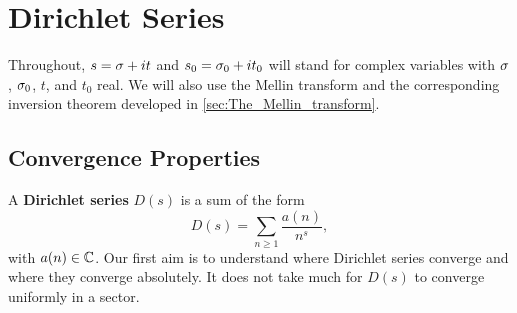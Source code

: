 \chapter{Dirichlet Series}
  Throughout, \(s = \sigma+it\) and \(s_{0} = \sigma_{0}+it_{0}\) will stand for complex variables with \(\sigma\), \(\sigma_{0}\), \(t\), and \(t_{0}\) real. We will also use the Mellin transform and the corresponding inversion theorem developed in \cref{sec:The_Mellin_transform}.
  \section{Convergence Properties}
    A \textbf{Dirichlet series} \(D(s)\) is a sum of the form
    \[
      D(s) = \sum_{n \ge 1}\frac{a(n)}{n^{s}},
    \]
    with \(a(n) \in \mathbb{C}\). Our first aim is to understand where Dirichlet series converge and where they converge absolutely. It does not take much for \(D(s)\) to converge uniformly in a sector.

